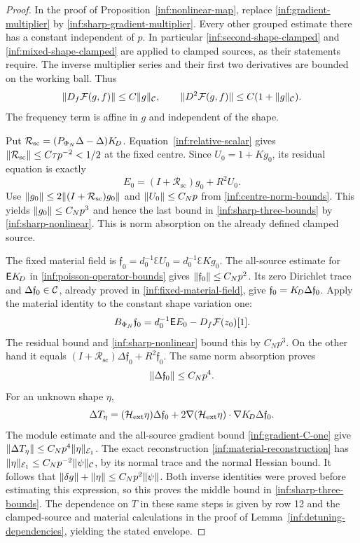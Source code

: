 \begin{proof}
In the proof of Proposition~\ref{inf:nonlinear-map}, replace
\eqref{inf:gradient-multiplier} by
\eqref{inf:sharp-gradient-multiplier}. Every other grouped estimate
there has a constant independent of $p$.
In particular \eqref{inf:second-shape-clamped} and
\eqref{inf:mixed-shape-clamped} are applied to clamped sources, as
their statements require. The inverse multiplier series and their
first two derivatives are bounded on the working ball. Thus
\begin{equation}\label{inf:sharp-nonlinear}
 \lVert D_f\mathcal F(g,f)\rVert\le C\lVert g\rVert_\mathcal C,
 \qquad \lVert D^2\mathcal F(g,f)\rVert\le C(1+\lVert g\rVert_\mathcal C).
\end{equation}
The frequency term is affine in $g$ and independent of the shape.

Put $\mathcal R_{\mathrm{sc}}=(P_{\Phi_N}\Delta-\Delta)K_{\!D}$.
Equation~\eqref{inf:relative-scalar} gives
$\lVert \mathcal R_{\mathrm{sc}}\rVert\le C\tau p^{-2}<1/2$ at the fixed
centre. Since $U_0=1+Kg_0$, its residual equation is exactly
\[
 E_0=(I+\mathcal R_{\mathrm{sc}})g_0+R^2U_0.
\]
Use $\lVert g_0\rVert\le2\lVert (I+\mathcal R_{\mathrm{sc}})g_0\rVert$ and
$\lVert U_0\rVert\le C_Np$ from \eqref{inf:centre-norm-bounds}.
This yields $\lVert g_0\rVert\le C_Np^3$ and hence the last bound in
\eqref{inf:sharp-three-bounds} by \eqref{inf:sharp-nonlinear}.
This is norm absorption on the already defined clamped source.

The fixed material field is
$\mathfrak f_0=d_0^{-1}\Euler U_0=d_0^{-1}\Euler Kg_0$.
The all-source estimate for $\mathsf EK_{\!D}$ in
\eqref{inf:poisson-operator-bounds} gives
$\lVert \mathfrak f_0\rVert\le C_Np^2$. Its zero Dirichlet trace and
$\Delta\mathfrak f_0\in\mathcal C$, already proved in
\eqref{inf:fixed-material-field}, give
$\mathfrak f_0=K_{\!D}\Delta\mathfrak f_0$.
Apply the material identity to the constant shape variation one:
\[
 B_{\Phi_N}\mathfrak f_0
 =d_0^{-1}\mathsf E E_0-D_f\mathcal F(z_0)[1].
\]
The residual bound and \eqref{inf:sharp-nonlinear} bound this by
$C_Np^3$. On the other hand it equals
$(I+\mathcal R_{\mathrm{sc}})\Delta\mathfrak f_0+R^2\mathfrak f_0$.
The same norm absorption proves
\begin{equation}\label{inf:sharp-material-field}
 \lVert \Delta\mathfrak f_0\rVert\le C_Np^4.
\end{equation}
For an unknown shape $\eta$,
\[
 \Delta T_\eta=(\mathcal H_{\mathrm{ext}}\eta)\Delta\mathfrak f_0
 +2\nabla(\mathcal H_{\mathrm{ext}}\eta)\cdot\nabla K_{\!D}\Delta\mathfrak f_0.
\]
The module estimate and the all-source gradient bound
\eqref{inf:gradient-C-one} give
$\lVert \Delta T_\eta\rVert\le C_Np^4\lVert \eta\rVert_{\mathcal E_1}$.
The exact reconstruction \eqref{inf:material-reconstruction} has
$\lVert \eta\rVert_{\mathcal E_1}\le C_Np^{-2}\lVert \psi\rVert_\mathcal C$, by its normal trace
and the normal Hessian bound. It follows that
$\lVert \delta g\rVert+\lVert \eta\rVert\le C_Np^2\lVert \psi\rVert$.
Both inverse identities were proved before estimating this expression,
so this proves the middle bound in \eqref{inf:sharp-three-bounds}.
The dependence on $T$ in these same steps is given by row 12 and
the clamped-source and material calculations in the proof of
Lemma~\ref{inf:detuning-dependencies}, yielding the stated envelope.
\end{proof}

